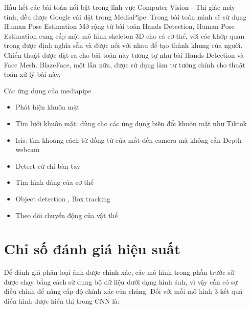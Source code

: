 Hầu hết các bài toán nổi bật trong lĩnh vực Computer Vision - Thị giác máy tính, đều được Google cài đặt trong MediaPipe. Trong bài toán mình sẽ sử dụng Human Pose Estimation Mở rộng từ bài toán Hands Detection, Human Pose Estimation cung cấp một mô hình skeleton 3D cho cả cơ thể, với các khớp quan trọng được định nghĩa sẵn và được nối với nhau để tạo thành khung của người. Chiến thuật được đặt ra cho bài toán này tương tự như bài Hands Detection và Face Mesh. BlazeFace, một lần nữa, được sử dụng làm tư tưởng chính cho thuật toán xử lý bài này.

Các ứng dụng của mediapipe
\begin{itemize}
    \item Phát hiện khuôn mặt
    \item Tìm lưới khuôn mặt: dùng cho các ứng dụng biến đổi khuôn mặt như Tiktok
    \item Iris: tìm khoảng cách từ đồng tử của mắt đến camera mà không cần Depth webcam
    \item Detect cử chỉ bàn tay
    \item Tìm hình dáng của cơ thể
    \item Object detection , Box tracking
    \item Theo dõi chuyển động của vật thể
\end{itemize}

\section{Chỉ số đánh giá hiệu suất}

Để đánh giá phân loại ảnh được chính xác, các mô hình trong phần trước sữ được chạy bằng cách sử dụng bộ dữ liệu dưới dạng hình ảnh, vì vậy cần có sự điều chỉnh để nâng cấp độ chính xác của chúng. Đối với mỗi mô hình 3 kết quả điển hình được hiển thị trong CNN là:

